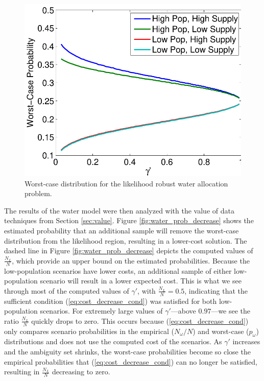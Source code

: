 \documentclass[11pt]{article}
\begin{document}
\begin{figure}
	\centering
	\includegraphics[width=.5\textwidth]{images/worst_case_probability}
	\caption{Worst-case distribution for the likelihood robust water allocation problem.}
	\label{fig:worst_case}
\end{figure}


The results of the water model were then analyzed with the value of data techniques from Section \ref{sec:value}.
Figure \ref{fig:water_prob_decrease} shows the estimated probability that an additional sample will remove the worst-case distribution from the likelihood region, resulting in a lower-cost solution. %
The dashed line in Figure \ref{fig:water_prob_decrease} depicts the computed values of $\frac{N_L}{N}$, which provide an upper bound on the estimated probabilities. 
Because the low-population scenarios have lower costs, an additional sample of either low-population scenario will result in a lower expected cost.
This is what we see through most of the computed values of $\gamma'$, with $\frac{N_L}{N} = 0.5$, indicating that the sufficient condition (\ref{eq:cost_decrease_cond}) was satisfied for both low-population scenarios.
For extremely large values of $\gamma'$---above $0.97$---we see the ratio $\frac{N_L}{N}$ quickly drops to zero.
This occurs because (\ref{eq:cost_decrease_cond}) only compares scenario probabilities in the empirical ($N_\omega / N$) and worst-case ($p_\omega$) distributions and does not use the computed cost of the scenarios.
As $\gamma'$ increases and the ambiguity set shrinks, the worst-case probabilities become so close the empirical probabilities that (\ref{eq:cost_decrease_cond}) can no longer be satisfied, resulting in $\frac{N_L}{N}$ decreasing to zero.
\end{document}
